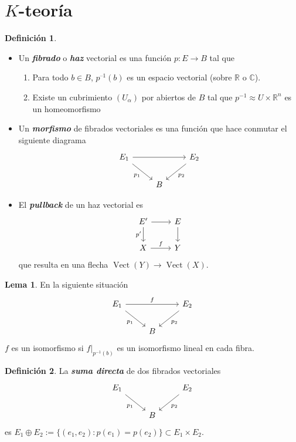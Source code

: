 \documentclass[spanish]{book}
\theoremstyle{definition}
\newtheorem*{defn}{Definición}
\newtheorem*{lema}{Lema}
\newcommand{\R}{\mathbb{R}}
\newcommand{\C}{\mathbb{C}}
\begin{document}
\section{$K$-teoría}
\begin{defn}\leavevmode
	\begin{itemize}
		\item Un \textbf{\textit{fibrado}} o \textbf{\textit{haz}} vectorial es una función $p:E\to B$ tal que
	\begin{enumerate}
		\item Para todo $b\in B$, $p^{–1}(b)$ es un espacio vectorial (sobre $\R$ o $\C$).
		
		\item Existe un cubrimiento $(U_\alpha)$ por abiertos de $B$ tal que $p^{-1}\approx U\times\R^n$ es un homeomorfismo
	\end{enumerate}
	\item Un \textbf{\textit{morfismo}} de fibrados vectoriales es una función que hace conmutar el siguiente diagrama
	\[\begin{tikzcd}
		E_1\arrow[rr]\arrow[dr,swap,"p_1"]&&E_2\arrow[dl,"p_2"]\\
		&B
	\end{tikzcd}\]
	\item El \textbf{\textit{pullback}} de un haz vectorial es
	\[\begin{tikzcd}
		E'\arrow[r]\arrow[d,swap,"p'"]&E\arrow[d]\\
		X\arrow[r,"f"]&Y
	\end{tikzcd}\]
	que resulta en una flecha $\operatorname{Vect}(Y)\to\operatorname{Vect}(X)$.
	\end{itemize}
\end{defn}
\begin{lema}
	En la siguiente situación
	\[\begin{tikzcd}
		E_1\arrow[rr,"f"]\arrow[rd,swap,"p_1"]&&E_2\arrow[ld,"p_2"]\\
		&B
	\end{tikzcd}\]
	$f$ es un isomorfismo si $f|_{p^{-1}(b)}$ es un isomorfismo lineal en cada fibra.
\end{lema}

\begin{defn}
	La \textbf{\textit{suma directa}} de dos fibrados vectoriales
	\[\begin{tikzcd}
		E_1\arrow[rd,swap,"p_1"]&&E_2\arrow[ld,"p_2"]\\
		&B
	\end{tikzcd}\]
	es $E_1\oplus E_2:=\{(e_1,e_2):p(e_1)=p(e_2)\}\subset E_1\times E_2$.
\end{defn}
\end{document}

